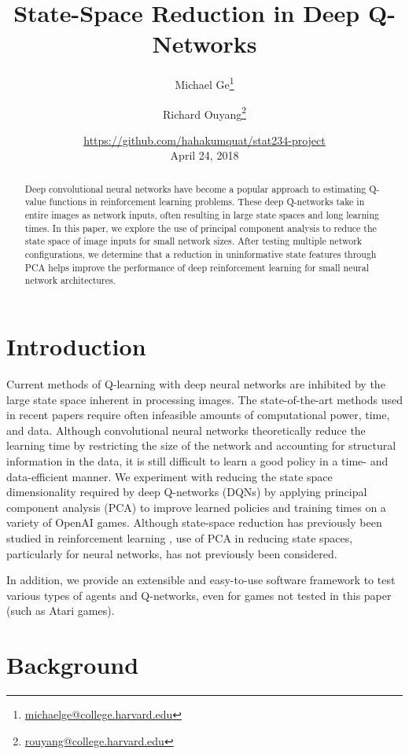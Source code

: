 \documentclass[11pt]{article}
\title{State-Space Reduction in Deep Q-Networks}
\author{Michael Ge\thanks{\url{michaelge@college.harvard.edu}} 
        \and 
        Richard Ouyang\thanks{\url{rouyang@college.harvard.edu}}}
\date{\small{\url{https://github.com/hahakumquat/stat234-project}}\\
      April 24, 2018}
\begin{document}
\maketitle

\begin{abstract}
Deep convolutional neural networks have become a popular approach to estimating Q-value functions in reinforcement learning problems. These deep Q-networks take in entire images as network inputs, often resulting in large state spaces and long learning times. In this paper, we explore the use of principal component analysis to reduce the state space of image inputs for small network sizes. After testing multiple network configurations, we determine that a reduction in uninformative state features through PCA helps improve the performance of deep reinforcement learning for small neural network architectures.
\end{abstract}

\newpage
\tableofcontents

\twocolumn
\newpage

\section{Introduction}

Current methods of Q-learning with deep neural networks are inhibited by the large state space inherent in processing images. The state-of-the-art methods used in recent papers \cite{mnih2013playing, mnih2015human, van2016deep} require often infeasible amounts of computational power, time, and data. Although convolutional neural networks theoretically reduce the learning time by restricting the size of the network and accounting for structural information in the data, it is still difficult to learn a good policy in a time- and data-efficient manner. We experiment with reducing the state space dimensionality required by deep Q-networks (DQNs) by applying principal component analysis (PCA) to improve learned policies and training times on a variety of O\-pen\-AI games. Although state-space reduction has previously been studied in reinforcement learning \cite{kishima2013reduction}, use of PCA in reducing state spaces, particularly for neural networks, has not previously been considered. 

In addition, we provide an extensible and easy-to-use software framework to test various types of agents and Q-networks, even for games not tested in this paper (such as Atari games).

\section{Background}
\end{document}
